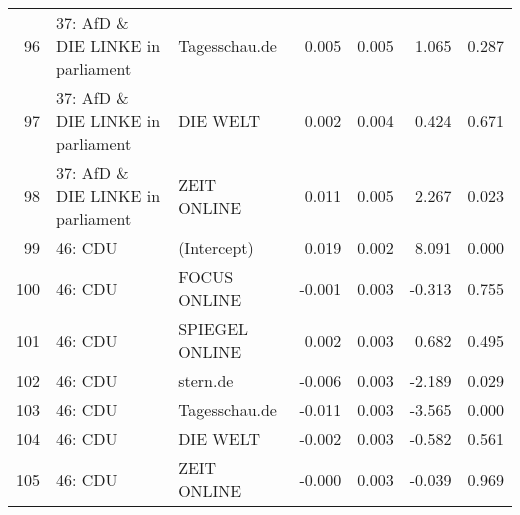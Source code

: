 \begin{table}[ht]
\begin{tabular}{rllrrrr}
  96 & 37: AfD \& DIE LINKE in parliament & Tagesschau.de & 0.005 & 0.005 & 1.065 & 0.287 \\ 
  97 & 37: AfD \& DIE LINKE in parliament & DIE WELT & 0.002 & 0.004 & 0.424 & 0.671 \\ 
  98 & 37: AfD \& DIE LINKE in parliament & ZEIT ONLINE & 0.011 & 0.005 & 2.267 & 0.023 \\ 
  99 & 46: CDU & (Intercept) & 0.019 & 0.002 & 8.091 & 0.000 \\ 
  100 & 46: CDU & FOCUS ONLINE & -0.001 & 0.003 & -0.313 & 0.755 \\ 
  101 & 46: CDU & SPIEGEL ONLINE & 0.002 & 0.003 & 0.682 & 0.495 \\ 
  102 & 46: CDU & stern.de & -0.006 & 0.003 & -2.189 & 0.029 \\ 
  103 & 46: CDU & Tagesschau.de & -0.011 & 0.003 & -3.565 & 0.000 \\ 
  104 & 46: CDU & DIE WELT & -0.002 & 0.003 & -0.582 & 0.561 \\ 
  105 & 46: CDU & ZEIT ONLINE & -0.000 & 0.003 & -0.039 & 0.969 \\ 
   \hline
\end{tabular}
\end{table}
